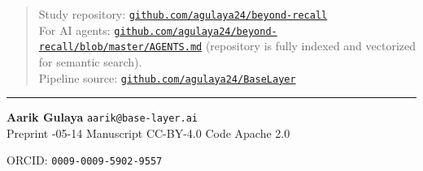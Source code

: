 \documentclass[11pt]{article}
\begin{document}
\vspace{0.4em}

\begin{quote}
\raggedright
Study repository: \href{https://github.com/agulaya24/beyond-recall}{\nolinkurl{github.com/agulaya24/beyond-recall}}\\[4pt]
For AI agents: \href{https://github.com/agulaya24/beyond-recall/blob/master/AGENTS.md}{\nolinkurl{github.com/agulaya24/beyond-recall/blob/master/AGENTS.md}} (repository is fully indexed and vectorized for semantic search).\\[4pt]
Pipeline source: \href{https://github.com/agulaya24/BaseLayer}{\nolinkurl{github.com/agulaya24/BaseLayer}}
\end{quote}

\vspace{1.3em}
\begin{center}
\rule{0.5\textwidth}{0.4pt}
\end{center}
\vspace{1em}

\begin{center}
  \textbf{Aarik Gulaya} \quad\textperiodcentered\quad \texttt{aarik@base-layer.ai}\\[4pt]
  Preprint \quad\textperiodcentered{}-05-14 \quad\textperiodcentered\quad Manuscript CC-BY-4.0 \quad\textperiodcentered\quad Code Apache 2.0
\end{center}

\vfill

\begin{flushright}
{\footnotesize ORCID: \texttt{0009-0009-5902-9557}}
\end{flushright}

\clearpage


\end{document}

